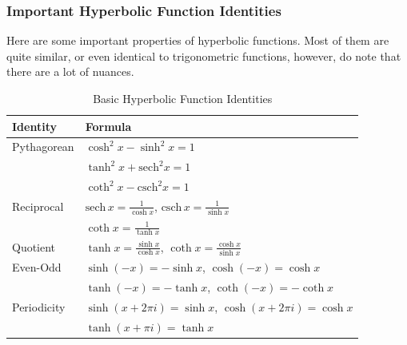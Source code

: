 \subsubsection{Important Hyperbolic Function Identities}
Here are some important properties of hyperbolic functions. Most of them are quite similar, or even identical to trigonometric functions, however, do note that there are a lot of nuances.
\begin{table}[h]
\centering
\begin{tabular}{@{}ll@{}}
\toprule
Identity & Formula \\
\midrule
Pythagorean & $\cosh^2 x - \sinh^2 x = 1$ \\
 & $\tanh^2 x + \text{sech}^2 x = 1$ \\
 & $\coth^2 x - \text{csch}^2 x = 1$ \\
\midrule
Reciprocal & $\text{sech} \, x = \frac{1}{\cosh x}$, $\text{csch} \, x = \frac{1}{\sinh x}$ \\
 & $\coth x = \frac{1}{\tanh x}$ \\
\midrule
Quotient & $\tanh x = \frac{\sinh x}{\cosh x}$, $\coth x = \frac{\cosh x}{\sinh x}$ \\
\midrule
Even-Odd & $\sinh(-x) = -\sinh x$, $\cosh(-x) = \cosh x$ \\
 & $\tanh(-x) = -\tanh x$, $\coth(-x) = -\coth x$ \\
\midrule
Periodicity & $\sinh(x + 2\pi i) = \sinh x$, $\cosh(x + 2\pi i) = \cosh x$ \\
 & $\tanh(x + \pi i) = \tanh x$ \\
\bottomrule
\end{tabular}
\caption{Basic Hyperbolic Function Identities}
\label{tab:basic_hyperbolic_identities}
\end{table}

